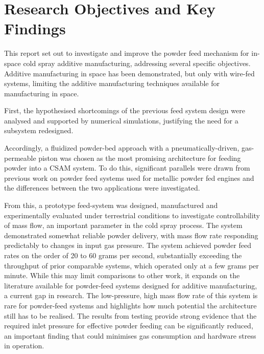 





\section{Research Objectives and Key Findings}
This report set out to investigate and improve the powder feed mechanism for in-space cold spray additive manufacturing, addressing several specific objectives. Additive manufacturing in space has been demonstrated, but only with wire-fed systems, limiting the additive manufacturing techniques available for manufacturing in space.

First, the hypothesised shortcomings of the previous feed system design were analysed and supported by numerical simulations, justifying the need for a subsystem redesigned. 

Accordingly, a fluidized powder-bed approach with a pneumatically-driven, gas-permeable piston was chosen as the most promising architecture for feeding powder into a CSAM system. To do this, significant parallels were drawn from previous work on powder feed systems used for metallic powder fed engines and the differences between the two applications were investigated.

From this, a prototype feed-system was designed, manufactured and experimentally evaluated under terrestrial conditions to investigate controllability of mass flow, an important parameter in the cold spray process. The system demonstrated somewhat reliable powder delivery, with mass flow rate responding predictably to changes in input gas pressure. The system achieved powder feed rates on the order of 20 to 60 grams per second, substantially exceeding the throughput of prior comparable systems, which operated only at a few grams per minute. While this may limit comparisons to other work, it expands on the literature available for powder-feed systems designed for additive manufacturing, a current gap in research. The low-pressure, high mass flow rate of this system is rare for powder-feed systems and highlights how much potential the architecture still has to be realised. The results from testing provide strong evidence that the required inlet pressure for effective powder feeding can be significantly reduced, an important finding that could minimises gas consumption and hardware stress in operation. 

